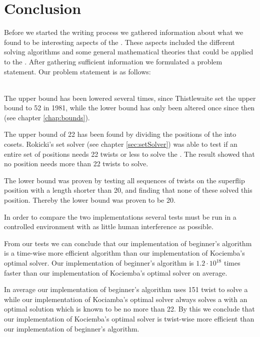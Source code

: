 \chapter{Conclusion}
\emptyTop{}
Before we started the writing process we gathered information about what we found to be interesting aspects of the \rubik{}. 
These aspects included the different solving algorithms and some general mathematical theories that could be applied to the \rubik{}.
After gathering sufficient information we formulated a problem statement. Our problem statement is as follows:


\ \\ \linebreak 
The upper bound has been lowered several times, since Thistlewaite set the upper bound to 52 in 1981, while the lower bound has only been altered once since then (see chapter \ref{chap:bounds}).

The upper bound of 22 has been found by dividing the positions of the \rubik{} into cosets.  Rokicki's set solver (see chapter \ref{sec:setSolver}) was able to test if an entire set of positions needs 22 twists or less to solve the \rubik{}. The result showed that no \rubik{} position needs more than 22 twists to solve.

The lower bound was proven by testing all sequences of twists on the superflip position with a length shorter than 20, and finding that none of these solved this position. Thereby the lower bound was proven to be 20. 


In order to compare the two implementations several tests must be run in a controlled environment with as little human interference as possible. 

From our tests we can conclude that our implementation of beginner's algorithm is a time-wise more efficient algorithm than our implementation of Kociemba's optimal solver. 
Our implementation of beginner's algorithm is $1.2\cdot10^{18}$ times faster than our implementation of Kociemba's optimal solver on average. 

In average our implementation of beginner's algorithm uses 151 twist to solve a \cube{} while our implementation of Kociamba's optimal solver always solves a \cube{} with an optimal solution which is known to be no more than 22. 
By this we conclude that our implementation of Kociemba's optimal solver is twist-wise more efficient than our implementation of beginner's algorithm. 




